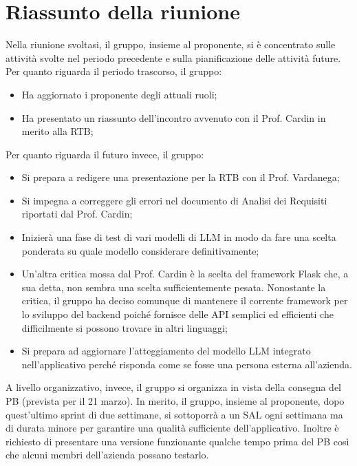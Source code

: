 \section{Riassunto della riunione}
Nella riunione svoltasi, il gruppo, insieme al proponente, si è concentrato sulle attività svolte nel periodo precedente e sulla pianificazione delle attività future. Per quanto riguarda il periodo trascorso, il gruppo:
\begin{itemize}
    \item Ha aggiornato i proponente degli attuali ruoli;
    \item Ha presentato un riassunto dell'incontro avvenuto con il Prof. Cardin in merito alla RTB;
\end{itemize}

Per quanto riguarda il futuro invece, il gruppo: 
\begin{itemize}
    \item Si prepara a redigere una presentazione per la RTB con il Prof. Vardanega;
    \item Si impegna a correggere gli errori nel documento di Analisi dei Requisiti riportati dal Prof. Cardin;
    \item Inizierà una fase di test di vari modelli di LLM in modo da fare una scelta ponderata su quale modello considerare definitivamente;
    \item Un'altra critica mossa dal Prof. Cardin è la scelta del framework Flask che, a sua detta, non sembra una scelta sufficientemente pesata. Nonostante la critica, il gruppo ha deciso comunque di mantenere il corrente framework per lo sviluppo del backend poiché fornisce delle API semplici ed efficienti che difficilmente si possono trovare in altri linguaggi;
    \item Si prepara ad aggiornare l'atteggiamento del modello LLM integrato nell'applicativo perché risponda come se fosse una persona esterna all'azienda. 
\end{itemize}

A livello organizzativo, invece, il gruppo si organizza in vista della consegna del PB (prevista per il 21 marzo). In merito, il gruppo, insieme al proponente, dopo quest'ultimo sprint di due settimane, si sottoporrà a un SAL ogni settimana ma di durata minore per garantire una qualità sufficiente dell'applicativo. Inoltre è richiesto di presentare una versione funzionante qualche tempo prima del PB così che alcuni membri dell'azienda possano testarlo.